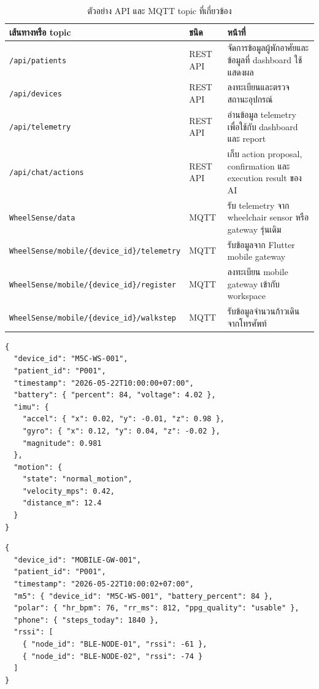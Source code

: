 \begin{table}[H]
    \centering
    \caption{ตัวอย่าง API และ MQTT topic ที่เกี่ยวข้อง}
    \label{tab:app_api_mqtt_topics}
    \renewcommand{\arraystretch}{1.18}
    \small
    \setlength{\tabcolsep}{3pt}
    \begin{tabular}{|L{0.32\textwidth}|L{0.18\textwidth}|L{0.40\textwidth}|}
        \hline
        \textbf{เส้นทางหรือ topic} & \textbf{ชนิด} & \textbf{หน้าที่} \\ \hline
        \texttt{/api/patients} & REST API & จัดการข้อมูลผู้พักอาศัยและข้อมูลที่ dashboard ใช้แสดงผล \\ \hline
        \texttt{/api/devices} & REST API & ลงทะเบียนและตรวจสถานะอุปกรณ์ \\ \hline
        \texttt{/api/telemetry} & REST API & อ่านข้อมูล telemetry เพื่อใช้กับ dashboard และ report \\ \hline
        \texttt{/api/chat/actions} & REST API & เก็บ action proposal, confirmation และ execution result ของ AI \\ \hline
        \texttt{WheelSense/data} & MQTT & รับ telemetry จาก wheelchair sensor หรือ gateway รุ่นเดิม \\ \hline
        \texttt{WheelSense/mobile/\{device\_id\}/telemetry} & MQTT & รับข้อมูลจาก Flutter mobile gateway \\ \hline
        \texttt{WheelSense/mobile/\{device\_id\}/register} & MQTT & ลงทะเบียน mobile gateway เข้ากับ workspace \\ \hline
        \texttt{WheelSense/mobile/\{device\_id\}/walkstep} & MQTT & รับข้อมูลจำนวนก้าวเดินจากโทรศัพท์ \\ \hline
    \end{tabular}
\end{table}

\begin{lstlisting}[caption={ตัวอย่าง payload จาก M5StickC Plus2 ผ่าน mobile gateway},label={lst:app_m5_payload}]
{
  "device_id": "M5C-WS-001",
  "patient_id": "P001",
  "timestamp": "2026-05-22T10:00:00+07:00",
  "battery": { "percent": 84, "voltage": 4.02 },
  "imu": {
    "accel": { "x": 0.02, "y": -0.01, "z": 0.98 },
    "gyro": { "x": 0.12, "y": 0.04, "z": -0.02 },
    "magnitude": 0.981
  },
  "motion": {
    "state": "normal_motion",
    "velocity_mps": 0.42,
    "distance_m": 12.4
  }
}
\end{lstlisting}

\begin{lstlisting}[caption={ตัวอย่าง payload จาก Flutter mobile gateway},label={lst:app_mobile_gateway_payload}]
{
  "device_id": "MOBILE-GW-001",
  "patient_id": "P001",
  "timestamp": "2026-05-22T10:00:02+07:00",
  "m5": { "device_id": "M5C-WS-001", "battery_percent": 84 },
  "polar": { "hr_bpm": 76, "rr_ms": 812, "ppg_quality": "usable" },
  "phone": { "steps_today": 1840 },
  "rssi": [
    { "node_id": "BLE-NODE-01", "rssi": -61 },
    { "node_id": "BLE-NODE-02", "rssi": -74 }
  ]
}
\end{lstlisting}

